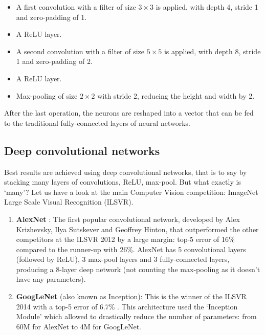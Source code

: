 \begin{itemize}
\item A first convolution with a filter of size $3\times3$ is applied, with depth 4, stride 1 and zero-padding of 1.
\item A ReLU layer.
\item A second convolution with a filter of size $5\times5$ is applied, with depth 8, stride 1 and zero-padding of 2.
\item A ReLU layer.
\item Max-pooling of size $2\times2$ with stride 2, reducing the height and width by 2.
\end{itemize}

After the last operation, the neurons are reshaped into a vector that can be fed to the traditional fully-connected layers of neural networks.

\subsection{Deep convolutional networks}
Best results are achieved using deep convolutional networks, that is to say by stacking many layers of convolutions, ReLU, max-pool. But what exactly is `many'? Let us have a look at the main Computer Vision competition: ImageNet Large Scale Visual Recognition (ILSVR).
\begin{enumerate}
\item \textbf{AlexNet} \cite{alexnet}: The first popular convolutional network, developed by Alex Krizhevsky, Ilya Sutskever and Geoffrey Hinton, that outperformed the other competitors at the ILSVR 2012 by a large margin: top-5 error of 16\% compared to the runner-up with 26\%. AlexNet has 5 convolutional layers (followed by ReLU), 3 max-pool layers and 3 fully-connected layers, producing a 8-layer deep network (not counting the max-pooling as it doesn't have any parameters).
\item \textbf{GoogLeNet} (also known as Inception)\cite{googlenet}: This is the winner of the ILSVR 2014 with a top-5 error of 6.7\% . This architecture used the `Inception Module' which allowed to drastically reduce the number of parameters: from 60M for AlexNet to 4M for GoogLeNet. 
\end{enumerate}


